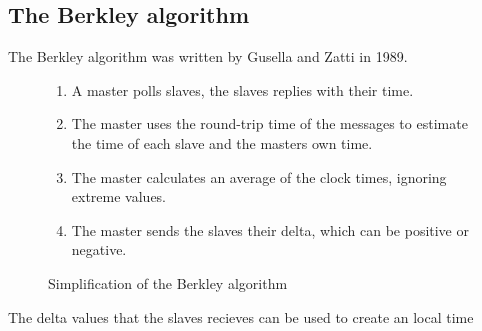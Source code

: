 \subsection{The Berkley algorithm}
The Berkley algorithm was written by Gusella and Zatti in 1989.

\begin{figure}[h!]
	\begin{enumerate}
    \item A master polls slaves, the slaves replies with their time.
    \item The master uses the round-trip time of the messages to estimate the time of each slave and the masters own time.
    \item The master calculates an average of the clock times, ignoring extreme values.
    \item The master sends the slaves their delta, which can be positive or negative. 
	\end{enumerate}
\caption{Simplification of the Berkley algorithm}
\label{fig:mifare-auth}
\end{figure}

The delta values that the slaves recieves can be used to create an local time 
